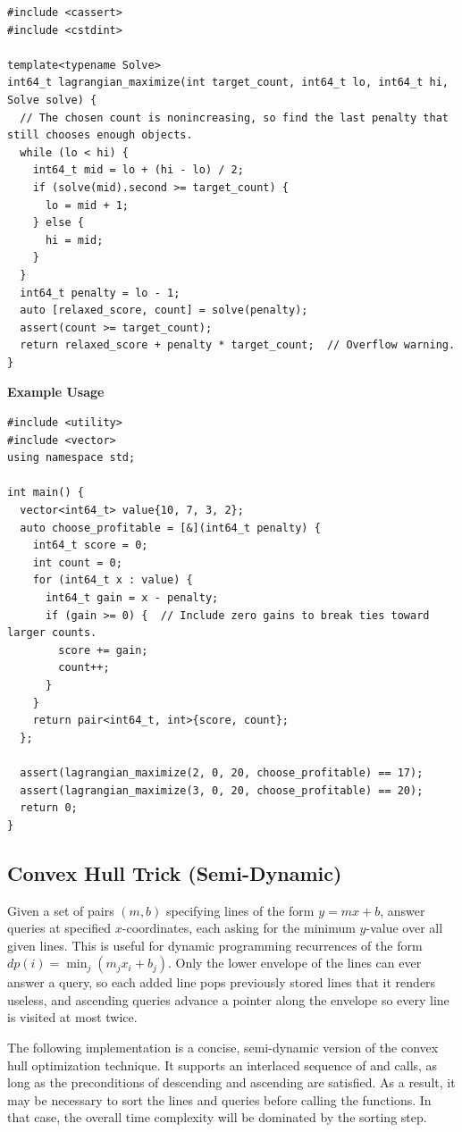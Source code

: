 \begin{lstlisting}[style=cpp]
#include <cassert>
#include <cstdint>

template<typename Solve>
int64_t lagrangian_maximize(int target_count, int64_t lo, int64_t hi, Solve solve) {
  // The chosen count is nonincreasing, so find the last penalty that still chooses enough objects.
  while (lo < hi) {
    int64_t mid = lo + (hi - lo) / 2;
    if (solve(mid).second >= target_count) {
      lo = mid + 1;
    } else {
      hi = mid;
    }
  }
  int64_t penalty = lo - 1;
  auto [relaxed_score, count] = solve(penalty);
  assert(count >= target_count);
  return relaxed_score + penalty * target_count;  // Overflow warning.
}
\end{lstlisting}
\textbf{Example Usage}\par
\begin{lstlisting}[style=cpp]
#include <utility>
#include <vector>
using namespace std;

int main() {
  vector<int64_t> value{10, 7, 3, 2};
  auto choose_profitable = [&](int64_t penalty) {
    int64_t score = 0;
    int count = 0;
    for (int64_t x : value) {
      int64_t gain = x - penalty;
      if (gain >= 0) {  // Include zero gains to break ties toward larger counts.
        score += gain;
        count++;
      }
    }
    return pair<int64_t, int>{score, count};
  };

  assert(lagrangian_maximize(2, 0, 20, choose_profitable) == 17);
  assert(lagrangian_maximize(3, 0, 20, choose_profitable) == 20);
  return 0;
}
\end{lstlisting}
\subsection{Convex Hull Trick (Semi-Dynamic)}
\label{sec:5.3.5}
Given a set of pairs $(m, b)$ specifying lines of the form $y = mx + b$, answer queries at specified $x$-coordinates, each asking for the minimum $y$-value over all given lines. This is useful for dynamic programming recurrences of the form $dp(i) = \min_j (m_j x_i + b_j)$. Only the lower envelope of the lines can ever answer a query, so each added line pops previously stored lines that it renders useless, and ascending queries advance a pointer along the envelope so every line is visited at most twice.

The following implementation is a concise, semi-dynamic version of the convex hull optimization technique. It supports an interlaced sequence of  and  calls, as long as the preconditions of descending  and ascending  are satisfied. As a result, it may be necessary to sort the lines and queries before calling the functions. In that case, the overall time complexity will be dominated by the sorting step.

